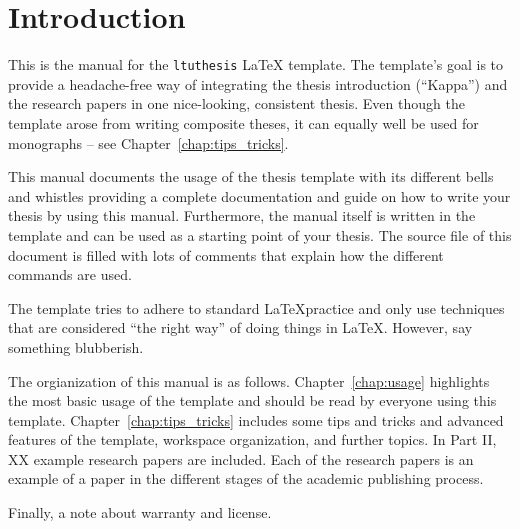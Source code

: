 \chapter{Introduction}
\label{chap:introduction}
This is the manual for the \texttt{ltuthesis} LaTeX template. The template's goal is to provide a headache-free way of integrating the thesis introduction (``Kappa'') and the research papers in one nice-looking, consistent thesis. Even though the template arose from writing composite theses, it can equally well be used for monographs -- see Chapter~\ref{chap:tips_tricks}.

This manual documents the usage of the thesis template with its different bells and whistles providing a complete documentation and guide on how to write your thesis by using this manual. Furthermore, the manual itself is written in the template and can be used as a starting point of your thesis. The source file of this document is filled with lots of comments that explain how the different commands are used.

The template tries to adhere to standard \LaTeX practice and only use techniques that are considered ``the right way'' of doing things in \LaTeX. However, {\color{red} say something blubberish.}

The orgianization of this manual is as follows. Chapter~\ref{chap:usage} highlights the most basic usage of the template and should be read by everyone using this template. Chapter~\ref{chap:tips_tricks} includes some tips and tricks and advanced features of the template, workspace organization, and further topics. In Part II, {\color{red} XX} example research papers are included. Each of the research papers is an example of a paper in the different stages of the academic publishing process.

Finally, {\color{red} a note about warranty and license}.
